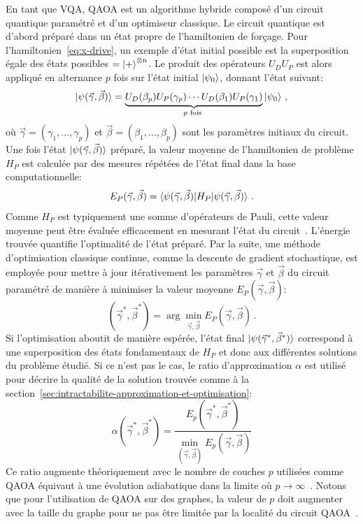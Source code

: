 En tant que VQA, QAOA est un algorithme hybride composé d'un circuit quantique paramétré et d'un optimiseur classique. Le circuit quantique est d'abord préparé dans un état propre de l'hamiltonien de forçage. Pour l'hamiltonien~\ref{eq:x-drive}, un exemple d'état initial possible est la superposition égale des états possibles $= \ket{+}^{\otimes n}$. Le produit des opérateurs $U_{D}U_{P}$ est alors appliqué en alternance $p$ fois sur l'état initial $\ket{\psi_{0}}$, donnant l'état suivant:
\begin{equation}
    \label{eq:final-state}
    \ket{\psi(\vec{\gamma}, \vec{\beta})} = \underbrace{U_D(\beta_p) U_P(\gamma_p) \cdots U_D(\beta_1) U_P(\gamma_1)}_{p \text{ fois }} \ket{\psi_{0}} \,,
\end{equation}
où $\vec{\gamma} = (\gamma_{1}, \dots, \gamma_{p})$ et $\vec{\beta} = (\beta_{1}, \dots, \beta_{p})$ sont les paramètres initiaux du circuit. Une fois l'état $\ket{\psi(\vec{\gamma}, \vec{\beta})}$ préparé, la valeur moyenne de l'hamiltonien de problème $H_{P}$ est calculée par des mesures répétées de l'état final dans la base computationnelle:
\begin{equation}
    E_{P} (\vec{\gamma}, \vec{\beta}) = \braket{ \psi(\vec{\gamma}, \vec{\beta}) | H_{P} | \psi(\vec{\gamma}, \vec{\beta}) } \,.
\end{equation}
Comme $H_{P}$ est typiquement une somme d'opérateurs de Pauli, cette valeur moyenne peut être évaluée efficacement en mesurant l'état du circuit~\cite{nielsenQuantumComputationQuantum2011}. L'énergie trouvée quantifie l'optimalité de l'état préparé. Par la suite, une méthode d'optimisation classique continue, comme la descente de gradient stochastique, est employée pour mettre à jour itérativement les paramètres $\vec{\gamma}$ et $\vec{\beta}$ du circuit paramétré de manière à minimiser la valeur moyenne $E_{P} (\vec{\gamma}, \vec{\beta})$:
\begin{equation}
    (\vec{\gamma}^{*}, \vec{\beta}^{*}) = \arg \min_{{\vec{\gamma}, \vec{\beta}}} E_{P}(\vec{\gamma}, \vec{\beta}) \,.
\end{equation}
Si l'optimisation aboutit de manière espérée, l'état final $\ket{\psi(\vec{\gamma}^{*}, \vec{\beta}^{*})}$ correspond à une superposition des états fondamentaux de $H_{P}$ et donc aux différentes solutions du problème étudié. Si ce n'est pas le cas, le ratio d'approximation $\alpha$ est utilisé pour décrire la qualité de la solution trouvée comme à la section~\ref{sec:intractabilite-approximation-et-optimisation}:
\begin{equation}
    \alpha (\vec{\gamma}^{*}, \vec{\beta}^{*}) = \frac{ E_{p} (\vec{\gamma}^{*}, \vec{\beta}^{*})}{\min_{(\vec{\gamma}, \vec{\beta})} E_{p} (\vec{\gamma}, \vec{\beta}) }
\end{equation}
Ce ratio augmente théoriquement avec le nombre de couches $p$ utilisées comme QAOA équivaut à une évolution adiabatique dans la limite où $p \to \infty$~\cite{farhiQuantumApproximateOptimization2014}. Notons que pour l'utilisation de QAOA sur des graphes, la valeur de $p$ doit augmenter avec la taille du graphe pour ne pas être limitée par la localité du circuit QAOA~\cite{farhiQuantumApproximateOptimization2020}.

